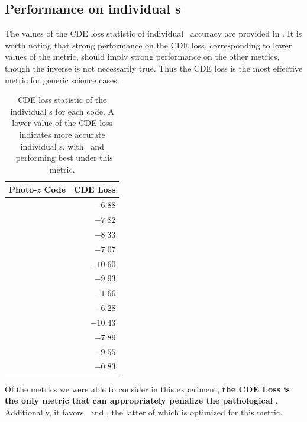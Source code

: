 \subsection{Performance on individual \pzpdf s}

The values of the CDE loss statistic of individual \pzpdf\ accuracy are provided in .
It is worth noting that strong performance on the CDE loss, corresponding to lower values of the metric, should imply strong performance on the other metrics, though the inverse is not necessarily true.
Thus the CDE loss is the most effective metric for generic science cases.

\begin{table}  %
	\centering
	\caption[CDE loss statistic of the individual \pzpdf s for each code considered in ]
		{CDE loss statistic of the individual \pzpdf s for each code.
		A lower value of the CDE loss indicates more accurate individual \pzpdf s, with \cmnn\ and \flexzboost\ performing best under this metric.}
	\begin{tabular}{lr}
		\hline
		Photo-$z$ Code & CDE Loss \\
		\hline
		\annz 	    & $-6.88$ \\
		\bpz 		    & $-7.82$ \\
		\delight    & $-8.33$\\
		\eazy       & $-7.07$ \\
		\flexzboost & $-10.60$\\
		\gpz		    & $-9.93$ \\
		\lephare 	  & $-1.66$ \\
		\metaphor 	& $-6.28$ \\
		\cmnn       & $-10.43$ \\
		\skynet 	  & $-7.89$ \\
		\tpz 		    & $-9.55$ \\
		\hline
		\trainz		  & $-0.83$ \\
	\end{tabular}
\end{table}

Of the metrics we were able to consider in this experiment, \textbf{the CDE Loss is the only metric that can appropriately penalize the pathological \trainz}.
Additionally, it favors \cmnn\ and \flexzboost, the latter of which is optimized for this metric.

